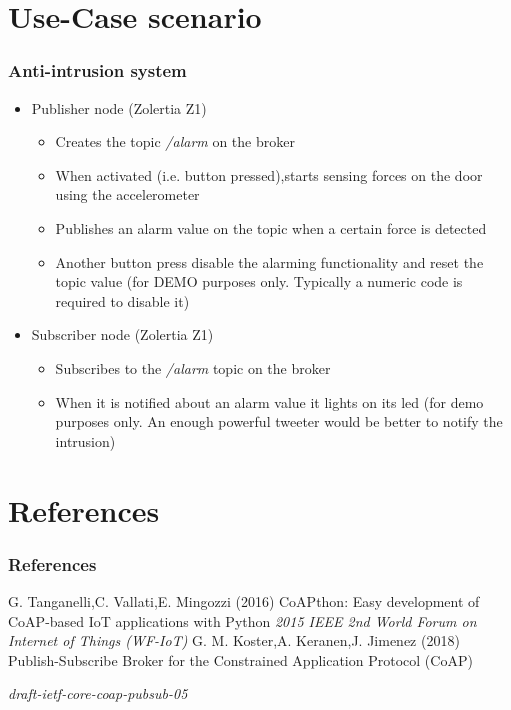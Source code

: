 \documentclass{beamer}
\begin{document}
\section{Use-Case scenario}
\begin{frame}
\frametitle{Anti-intrusion system} 
\begin{itemize}
  \item Publisher node (Zolertia Z1)\pause
  \begin{itemize}
    \item Creates the topic \textit{/alarm} on the broker\pause
    \item When activated (i.e. button pressed),starts sensing forces on the door using the accelerometer\pause
    \item Publishes an alarm value on the topic when a certain force is detected\pause
    \item Another button press disable the alarming functionality and reset the topic value (for DEMO purposes only. Typically a numeric code is required to disable it)
  \end{itemize}\pause

  \item Subscriber node (Zolertia Z1)\pause
  \begin{itemize}
    \item Subscribes to the \textit{/alarm} topic on the broker\pause
    \item When it is notified about an alarm value it lights on its led (for demo purposes only. An enough powerful tweeter would be better to notify the intrusion)
  \end{itemize}
\end{itemize}
\end{frame}
\section{References}
\begin{frame}
\frametitle{References}
\footnotesize{
\begin{thebibliography}{99} %
G. Tanganelli,C. Vallati,E. Mingozzi (2016)
\newblock CoAPthon: Easy development of CoAP-based IoT applications with Python
\newblock \emph{2015 IEEE 2nd World Forum on Internet of Things (WF-IoT)}
G. M. Koster,A. Keranen,J. Jimenez (2018)
\newblock Publish-Subscribe Broker for the Constrained Application Protocol (CoAP)

\newblock \emph{draft-ietf-core-coap-pubsub-05}
\end{thebibliography}
}
\end{frame}
\end{document}
